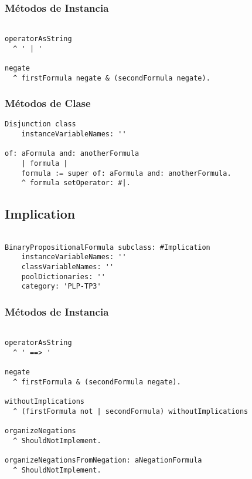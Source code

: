 \documentclass[spanish, 10pt,a4paper]{article}
\numberwithin{equation}{section} %
\begin{document}
\subsubsection{Métodos de Instancia}
\begin{lstlisting}

operatorAsString
  ^ ' | '

negate
  ^ firstFormula negate & (secondFormula negate).

\end{lstlisting}

\subsubsection{Métodos de Clase}

\begin{lstlisting}
Disjunction class
	instanceVariableNames: ''

of: aFormula and: anotherFormula
	| formula |
	formula := super of: aFormula and: anotherFormula.
	^ formula setOperator: #|.

\end{lstlisting}

\subsection{Implication}

\begin{lstlisting}

BinaryPropositionalFormula subclass: #Implication
	instanceVariableNames: ''
	classVariableNames: ''
	poolDictionaries: ''
	category: 'PLP-TP3'

\end{lstlisting}

\subsubsection{Métodos de Instancia}
\begin{lstlisting}

operatorAsString
  ^ ' ==> '

negate
  ^ firstFormula & (secondFormula negate).

withoutImplications
  ^ (firstFormula not | secondFormula) withoutImplications

organizeNegations
  ^ ShouldNotImplement. 

organizeNegationsFromNegation: aNegationFormula
  ^ ShouldNotImplement.

\end{lstlisting}
\end{document}

